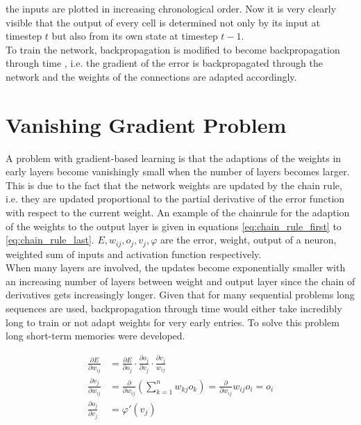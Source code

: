 
the inputs are plotted in increasing chronological order. Now it is very clearly visible that the output of every cell is determined not only by its input at timestep $t$ but also from its own state at timestep $t-1$. \\
To train the network, backpropagation is modified to become backpropagation through time \cite{werbos_backpropagation_1990}, i.e. the gradient of the error is backpropagated through the network and the weights of the connections are adapted accordingly. 

\section{Vanishing Gradient Problem}

A problem with gradient-based learning is that the adaptions of the weights in early layers become vanishingly small when the number of layers becomes larger. This is due to the fact that the network weights are updated by the chain rule, i.e. they are updated proportional to the partial derivative of the error function with respect to the current weight. An example of the chainrule for the adaption of the weights to the output layer is given in equations \ref{eq:chain_rule_first} to \ref{eq:chain_rule_last}. $E, w_{ij}, o_j, v_j, \varphi$ are the error, weight, output of a neuron, weighted sum of inputs and activation function respectively.\\
When many layers are involved, the updates become exponentially smaller with an increasing number of layers between weight and output layer since the chain of derivatives gets increasingly longer. Given that for many sequential problems long sequences are used, backpropagation through time would either take incredibly long to train or not adapt weights for very early entries. To solve this problem long short-term memories were developed.


\begin{align}
	\frac{\partial E}{\partial w_{ij}} &= \frac{\partial E}{\partial o_j} \cdot \frac{\partial o_j}{\partial v_j} \cdot \frac{\partial v_j}{w_{ij}}
	\label{eq:chain_rule_first} \\
	\frac{\partial v_j}{\partial w_{ij}} &= \frac{\partial}{\partial w_{ij}}(\sum_{k = 1}^{n} w_{kj}o_k) = \frac{\partial}{\partial w_{ij}} w_{ij} o_i = o_i\\
	\frac{\partial o_j}{\partial v_j} &= \varphi'(v_j)
	\label{eq:chain_rule_last}
\end{align}




